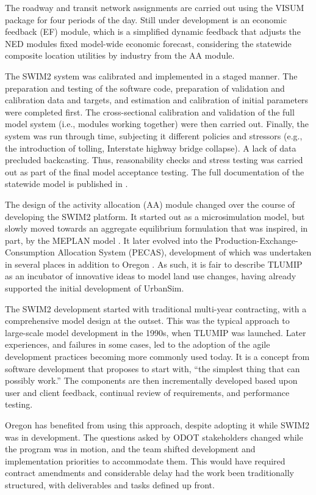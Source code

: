 The roadway and transit network assignments are carried out using the VISUM package for four periods of the day. Still under development is an economic feedback (EF) module, which is a simplified dynamic feedback that adjusts the NED modules fixed model-wide economic forecast, considering the statewide composite location utilities by industry from the AA module.

The SWIM2 system was calibrated and implemented in a staged manner. The preparation and testing of the software code, preparation of validation and calibration data and targets, and estimation and calibration of initial parameters were completed first. The cross-sectional calibration and validation of the full model system (i.e., modules working together) were then carried out. Finally, the system was run through time, subjecting it different policies and stressors (e.g., the introduction of tolling, Interstate highway bridge collapse). A lack of data precluded backcasting. Thus, reasonability checks and stress testing was carried out as part of the final model acceptance testing. The full documentation of the statewide model is published in \cite{donnelly17}.

The design of the activity allocation (AA) module changed over the course of developing the SWIM2 platform. It started out as a microsimulation model, but slowly moved towards an aggregate equilibrium formulation that was inspired, in part, by the MEPLAN model \citep{echenique07}. It later evolved into the Production-Exchange-Consumption Allocation System (PECAS), development of which was undertaken in several places in addition to Oregon \citep{hunt05}. As such, it is fair to describe TLUMIP as an incubator of innovative ideas to model land use changes, having already supported the initial development of UrbanSim.

The SWIM2 development started with traditional multi-year contracting, with a comprehensive model design at the outset. This was the typical approach to large-scale model development in the 1990s, when TLUMIP was launched. Later experiences, and failures in some cases, led to the adoption of the agile development practices becoming more commonly used today. It is a concept from software development that proposes to start with, ``the simplest thing that can possibly work.'' The components are then incrementally developed based upon user and client feedback, continual review of requirements, and performance testing. 

Oregon has benefited from using this approach, despite adopting it while SWIM2 was in development. The questions asked by ODOT stakeholders changed while the program was in motion, and the team shifted development and implementation priorities to accommodate them. This would have required contract amendments and considerable delay had the work been traditionally structured, with deliverables and tasks defined up front.

